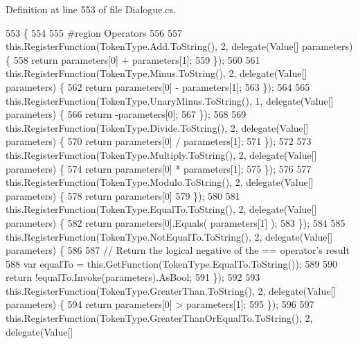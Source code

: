 Definition at line 553 of file Dialogue.\-cs.


\begin{DoxyCode}
553                                      \{
554 
555 \textcolor{preprocessor}{                #region Operators}
556 \textcolor{preprocessor}{}
557                 this.RegisterFunction(TokenType.Add.ToString(), 2, delegate(Value[] parameters) \{
558                     \textcolor{keywordflow}{return} parameters[0] + parameters[1];
559                 \});
560 
561                 this.RegisterFunction(TokenType.Minus.ToString(), 2, delegate(Value[] parameters) \{
562                     \textcolor{keywordflow}{return} parameters[0] - parameters[1];
563                 \});
564 
565                 this.RegisterFunction(TokenType.UnaryMinus.ToString(), 1, delegate(Value[] parameters) \{
566                     \textcolor{keywordflow}{return} -parameters[0];
567                 \});
568 
569                 this.RegisterFunction(TokenType.Divide.ToString(), 2, delegate(Value[] parameters) \{
570                     \textcolor{keywordflow}{return} parameters[0] / parameters[1];
571                 \});
572 
573                 this.RegisterFunction(TokenType.Multiply.ToString(), 2, delegate(Value[] parameters) \{
574                     \textcolor{keywordflow}{return} parameters[0] * parameters[1];
575                 \});
576 
577                 this.RegisterFunction(TokenType.Modulo.ToString(), 2, delegate(Value[] parameters) \{
578                     \textcolor{keywordflow}{return} parameters[0] %
579                 \});
580 
581                 this.RegisterFunction(TokenType.EqualTo.ToString(), 2, delegate(Value[] parameters) \{
582                     \textcolor{keywordflow}{return} parameters[0].Equals( parameters[1] );
583                 \});
584 
585                 this.RegisterFunction(TokenType.NotEqualTo.ToString(), 2, delegate(Value[] parameters) \{
586 
587                     \textcolor{comment}{// Return the logical negative of the == operator's result}
588                     var equalTo = this.GetFunction(TokenType.EqualTo.ToString());
589 
590                     \textcolor{keywordflow}{return} !equalTo.Invoke(parameters).AsBool;
591                 \});
592 
593                 this.RegisterFunction(TokenType.GreaterThan.ToString(), 2, delegate(Value[] parameters) \{
594                     \textcolor{keywordflow}{return} parameters[0] > parameters[1];
595                 \});
596 
597                 this.RegisterFunction(TokenType.GreaterThanOrEqualTo.ToString(), 2, delegate(Value[] 

\end{DoxyCode}
